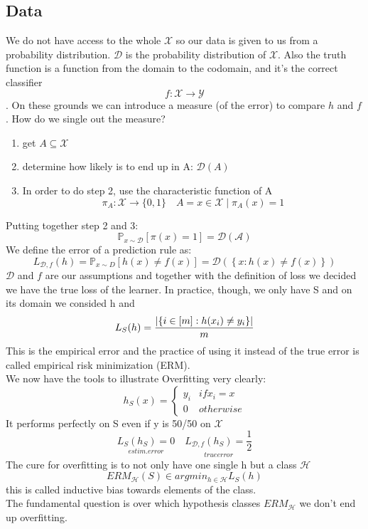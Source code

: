 \subsection{Data}
We do not have access to the whole $\mathcal{X}$ so our data is given to us from a probability distribution. $\mathcal{D}$ is the probability distribution of $\mathcal{X}$. Also the truth function is a function from the domain to the codomain, and it's the correct classifier
\[ 
    f: \mathcal{X} \longrightarrow \mathcal{Y} 
\].
On these grounds we can introduce a measure (of the error) to compare $h$ and $f$. How do we single out the measure? 
\begin{enumerate}
    \item get $A \subseteq \mathcal{X}$
    \item determine how likely is to end up in A: $\mathcal{D}(A)$
    \item In order to do step 2, use the characteristic function of A
    \[ 
        \pi_A : \mathcal{X} \longrightarrow \{0,1\}\quad A = {x\in \mathcal{X}\mid \pi_A(x)=1} 
    \]
\end{enumerate}
Putting together step 2 and 3:
\[ 
    \mathbb{P}_{x\sim\mathcal{D}}[\pi(x)=1] = \mathcal{D(A)} 
\]
We define the error of a prediction rule as:
\[ 
    L_{\mathcal{D},f}(h)= \mathbb{P}_{x\sim D}[h(x)\neq f(x)]=\mathcal{D}(\left\{ x: h(x) \neq f(x) \right\}) 
\]$\mathcal{D} $ and $f$ are our assumptions and together with the definition of loss we decided we have the true loss of the learner. In practice, though, we only have S and on its domain we consided h and 
\[ 
    L_S(h) = \frac{\left\lvert\left\{ i \in[m]: h(x_i) \neq y_i \right\}\right\rvert}{m} 
\]
This is the empirical error and the practice of using it instead of the true error is called empirical risk minimization (ERM).\\
We now have the tools to illustrate Overfitting very clearly:
\[ 
    h_S(x) = \begin{cases}
        y_i & if x_i = x\\
        0 & otherwise
    \end{cases} 
\]It performs perfectly on S even if y is 50/50 on $\mathcal{X}$
\[ 
    \underset{estim. error}{L_S(h_S) = 0} \quad \underset{true error}{L_{\mathcal{D},f}(h_S)= \frac{1}{2}} 
\]
The cure for overfitting is to not only have one single h but a class $\mathcal{H}$
\[ 
    ERM_\mathcal{H}(S) \in argmin_{h \in \mathcal{H}}{L_S(h)} 
\]this is called inductive bias towards elements of the class.\\
The fundamental question is over which hypothesis classes $ERM_\mathcal{H}$ we don't end up overfitting.\\\\
